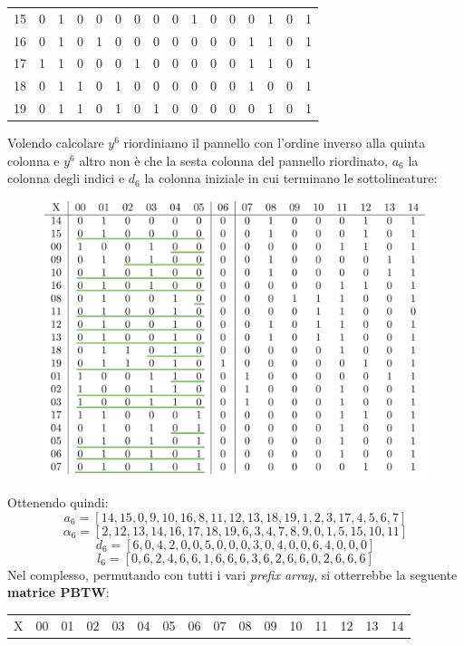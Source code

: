 \begin{esempio}
\begin{table}[H]
\begin{tabular}{c|ccccccccccccccc}
      15 & 0 & 1 & 0 & 0 & 0 & 0 & 0 & 0 & 1 & 0 & 0 & 0 & 1 & 0 & 1 \\
      16 & 0 & 1 & 0 & 1 & 0 & 0 & 0 & 0 & 0 & 0 & 0 & 1 & 1 & 0 & 1 \\
      17 & 1 & 1 & 0 & 0 & 0 & 1 & 0 & 0 & 0 & 0 & 0 & 1 & 1 & 0 & 1 \\
      18 & 0 & 1 & 1 & 0 & 1 & 0 & 0 & 0 & 0 & 0 & 0 & 1 & 0 & 0 & 1 \\
      19 & 0 & 1 & 1 & 0 & 1 & 0 & 1 & 0 & 0 & 0 & 0 & 0 & 1 & 0 & 1 
    \end{tabular}
  \end{table}
  Volendo calcolare $y^6$ riordiniamo il pannello con l'ordine inverso alla
  quinta colonna e $y^6$ altro non è che la sesta colonna del pannello
  riordinato, $a_6$ la colonna degli indici e $d_6$ la colonna iniziale in cui
  terminano le sottolineature:  
  \begin{figure}[H]
    \centering
    \includegraphics[scale = 0.365]{img/matrix1.pdf}
  \end{figure}
  Ottenendo quindi:
  \[a_6=[14,15,0,9,10,16,8,11,12,13,18,19,1,2,3,17,4,5,6,7]\]
  \[\alpha_6=[2,12,13,14,16,17,18,19,6,3,4,7,8,9,0,1,5,15,10,11]\]
  \[d_6=[6,0,4,2,0,0,5,0,0,0,3,0,4,0,0,6,4,0,0,0]\]
  \[l_6=[0,6,2,4,6,6,1,6,6,6,3,6,2,6,6,0,2,6,6,6]\]
  Nel complesso, permutando con tutti i vari \textit{prefix array}, si
  otterrebbe la seguente \textbf{matrice PBTW}:
  \begin{table}[H]
  \centering
  \footnotesize
  \begin{tabular}{c|ccccccccccccccc}
    X & 00 & 01 & 02 & 03 & 04 & 05 & 06 & 07 & 08 & 09 & 10 & 11 & 12 & 13
    & 14 \\

\end{tabular}
\end{table}
\end{esempio}
